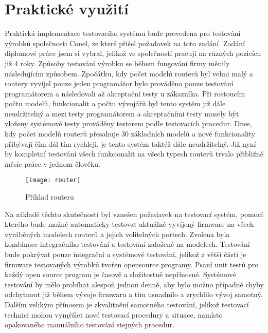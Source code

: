 \section{Praktické využití}
Praktická implementace testovacího systému bude provedena pro testování výrobků společnosti Conel, ze které přišel požadavek na toto zadání. Zadání diplomové práce jsem si vybral, jelikož ve společností pracuji na různých pozicích již 4 roky. Způsoby testování výrobku se během fungování firmy měnily následujícím způsobem. Zpočátku, kdy počet modelů routerů byl velmi malý a routery vyvíjel pouze jeden programátor bylo prováděno pouze testování programátorem a následovali až akceptační testy u zákazníka. Při rostoucím počtu modelů, funkcionalit a počtu vývojářů byl tento systém již dále neudržitelný a mezi testy programátorem a akceptačními testy musely být vloženy systémové testy prováděny testerem podle testovacích procedur. Dnes, kdy počet modelů routerů přesahuje 30 základních modelů a nové funkcionality  přibývají čím dál tím rychleji, je tento systém taktéž dále neudržitelný. Již nyní by kompletní testování všech funkcionalit na všech typech routerů trvalo přibližně měsíc práce v jednom člověku.

\begin{figure}[h]
	\centering
	\texttt{[image: router]}
	\caption{Příklad routeru}
	\label{fig:router}
\end{figure}

Na základě těchto skutečností byl vznešen požadavek na testovací systém, pomocí kterého bude možné automaticky testovat aktuálně vyvíjený firmware na všech vyráběných modelech routerů a jejich volitelných portech. Zvolena byla kombinace integračního testování a testování založené na modelech. Testování bude pokrývat pouze integrační a systémové testování, jelikož z větší části je firmware testovaných výrobků tvořen opensource programy. Psaní unit testů pro každý open source program je časově a složitostně nepřínosné. Systémové testování by mělo probíhat alespoň jednou denně, aby bylo možno případné chyby odchytnout již během vývoje firmwaru a tím usnadnilo a zrychlilo vývoj samotný. Dalším velikým přínosem je zkvalitnění samotného testování, jelikož testovací technici mohou vymýšlet nové testovací procedury a situace, namísto opakovaného manuálního testování stejných procedur.

